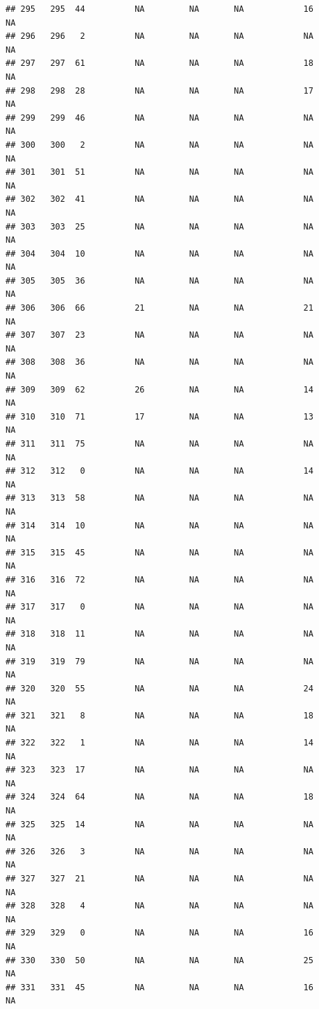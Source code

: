 \documentclass[man]{apa6}
\begin{document}
\begin{verbatim}
## 295   295  44          NA         NA       NA            16       NA
## 296   296   2          NA         NA       NA            NA       NA
## 297   297  61          NA         NA       NA            18       NA
## 298   298  28          NA         NA       NA            17       NA
## 299   299  46          NA         NA       NA            NA       NA
## 300   300   2          NA         NA       NA            NA       NA
## 301   301  51          NA         NA       NA            NA       NA
## 302   302  41          NA         NA       NA            NA       NA
## 303   303  25          NA         NA       NA            NA       NA
## 304   304  10          NA         NA       NA            NA       NA
## 305   305  36          NA         NA       NA            NA       NA
## 306   306  66          21         NA       NA            21       NA
## 307   307  23          NA         NA       NA            NA       NA
## 308   308  36          NA         NA       NA            NA       NA
## 309   309  62          26         NA       NA            14       NA
## 310   310  71          17         NA       NA            13       NA
## 311   311  75          NA         NA       NA            NA       NA
## 312   312   0          NA         NA       NA            14       NA
## 313   313  58          NA         NA       NA            NA       NA
## 314   314  10          NA         NA       NA            NA       NA
## 315   315  45          NA         NA       NA            NA       NA
## 316   316  72          NA         NA       NA            NA       NA
## 317   317   0          NA         NA       NA            NA       NA
## 318   318  11          NA         NA       NA            NA       NA
## 319   319  79          NA         NA       NA            NA       NA
## 320   320  55          NA         NA       NA            24       NA
## 321   321   8          NA         NA       NA            18       NA
## 322   322   1          NA         NA       NA            14       NA
## 323   323  17          NA         NA       NA            NA       NA
## 324   324  64          NA         NA       NA            18       NA
## 325   325  14          NA         NA       NA            NA       NA
## 326   326   3          NA         NA       NA            NA       NA
## 327   327  21          NA         NA       NA            NA       NA
## 328   328   4          NA         NA       NA            NA       NA
## 329   329   0          NA         NA       NA            16       NA
## 330   330  50          NA         NA       NA            25       NA
## 331   331  45          NA         NA       NA            16       NA

\end{verbatim}
\end{document}
